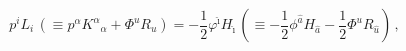 \begin{equation} p^i L_i\, (\equiv p^\alpha K^{ \alpha}{}_\alpha +\Phi^u R_u)=
-\frac{1}{2}\varphi^{\hat\imath} H_{\hat\imath}\,(\equiv -\frac{1}{2}
\phi^{\hat a} H_{\hat a} -\frac{1}{2}
\Phi^u R_{\hat u})  
\, ,
\end{equation} 
